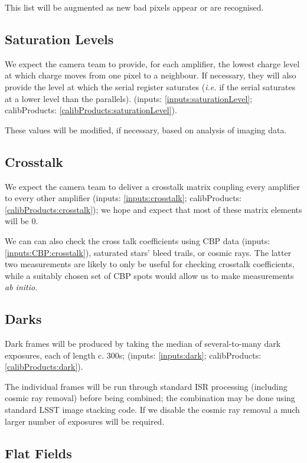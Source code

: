 \documentclass[12pt]{article}
\newcommand{\ie}{\textit{i.e.}\xspace}
\newcommand{\inputData}[1]{(inputs: \ref{inputs:#1})}
\newcommand{\inputOutputData}[1]{(inputs: \ref{inputs:#1}; calibProducts: \ref{calibProducts:#1})}
\begin{document}
This list will be augmented as new bad pixels appear or are recognised.

\subsection{Saturation Levels}

We expect the camera team to provide, for each amplifier, the lowest charge level at which charge moves from
one pixel to a neighbour.  If necessary, they will also provide the level at which the serial register
saturates (\ie if the serial saturates at a lower level than the parallels).
\inputOutputData{saturationLevel}.

These values will be modified, if necessary, based on analysis of imaging data.

\subsection{Crosstalk}
\label{sec:crosstalk}

We expect the camera team to deliver a crosstalk matrix coupling every amplifier to every other amplifier
\inputOutputData{crosstalk}; we hope and expect that most of these matrix elements will be 0.

We can can also check the cross talk coefficients using CBP data \inputData{CBP:crosstalk}, saturated
stars' bleed trails, or cosmic rays.  The latter two measurements are likely to only be useful for
checking crosstalk coefficients, while a suitably chosen set of CBP spots would allow us to make
measurements \textit{ab initio}.

\subsection{Darks}

Dark frames will be produced by taking the median of several-to-many dark exposures, each of length c. 300s;
\inputOutputData{dark}.

The individual frames will be run through standard ISR processing (including cosmic ray removal) before
being combined;  the combination may be done using standard LSST image stacking code.  If we disable the
cosmic ray removal a much larger number of exposures will be required.

\subsection{Flat Fields}
\end{document}
